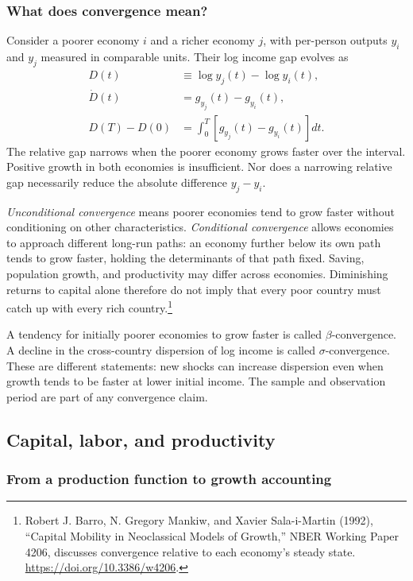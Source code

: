 \subsubsection{What does convergence mean?}

Consider a poorer economy $i$ and a richer economy $j$, with per-person outputs
$y_i$ and $y_j$ measured in comparable units. Their log income gap evolves as
\begin{align}
D(t)&\equiv\log y_j(t)-\log y_i(t),\\
\dot D(t)&=g_{y_j}(t)-g_{y_i}(t),\\
D(T)-D(0)&=\int_0^T\left[g_{y_j}(t)-g_{y_i}(t)\right]dt.
\end{align}
The relative gap narrows when the poorer economy grows faster over the interval.
Positive growth in both economies is insufficient. Nor does a narrowing
relative gap necessarily reduce the absolute difference $y_j-y_i$.

\textit{Unconditional convergence} means poorer economies tend to grow faster
without conditioning on other characteristics. \textit{Conditional convergence}
allows economies to approach different long-run paths: an economy further
below its own path tends to grow faster, holding the determinants of that path
fixed. Saving, population growth, and productivity may differ across economies.
Diminishing returns to capital alone therefore do not imply that every poor
country must catch up with every rich country.\footnote{Robert J. Barro,
N. Gregory Mankiw, and Xavier Sala-i-Martin (1992), ``Capital Mobility in
Neoclassical Models of Growth,'' NBER Working Paper 4206, discusses convergence
relative to each economy's steady state. \url{https://doi.org/10.3386/w4206}.}

A tendency for initially poorer economies to grow faster is called
$\beta$-convergence. A decline in the cross-country dispersion of log income is
called $\sigma$-convergence. These are different statements: new shocks can
increase dispersion even when growth tends to be faster at lower initial
income. The sample and observation period are part of any convergence claim.

\subsection{Capital, labor, and productivity}

\subsubsection{From a production function to growth accounting}

